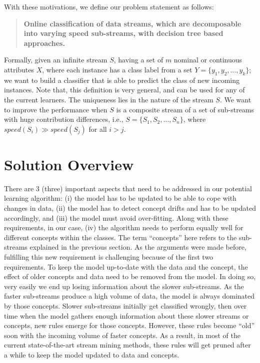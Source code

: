 With these motivations, we define our problem statement as follows:

\begin{quotation}
    \textbf{Online classification of data streams, which are decomposable into varying speed sub-streams, with decision tree based approaches.}
\end{quotation}

\noindent Formally, given an infinite stream $S$, having a set of $m$ nominal or continuous attributes $X$, where each instance has a class label from a set $Y = \{y_1, y_2, \dots, y_k\}$; we want to build a classifier that is able to predict the class of new incoming instances. Note that, this definition is very general, and can be used for any of the current learners. The uniqueness lies in the nature of the stream $S$. We want to improve the performance when $S$ is a composite stream of a set of sub-streams with huge contribution differences, i.e., $S = \{S_1, S_2, \dots, S_n\}$, where $speed(S_i) \gg speed(S_j)$ for all $i > j$.


\section{Solution Overview}
There are 3 (three) important aspects that need  to be addressed in our potential learning algorithm: (i) the model has to be updated to be able to cope with changes in data, (ii) the model has to detect concept drifts and has to be updated accordingly, and (iii) the model must avoid over-fitting. Along with these requirements, in our case, (iv) the algorithm needs to perform equally well for different concepts within the classes. The term ``concepts'' here refers to the sub-streams explained in the previous section. As the arguments were made before, fulfilling this new requirement is challenging because of the first two requirements. To keep the model up-to-date with the data and the concept, the effect of older concepts and data need to be removed from the model. In doing so, very easily we end up losing information about the slower sub-streams. As the faster sub-streams produce a high volume of data, the model is always dominated by those concepts. Slower sub-streams initially get classified wrongly, then over time when the model gathers enough information about these slower streams or concepts, new rules emerge for those concepts. However, these rules become ``old''  soon with the incoming volume of faster concepts. As a result, in most of the current state-of-the-art stream mining methods, these rules will get pruned after a while to keep the model updated to data and concepts.

